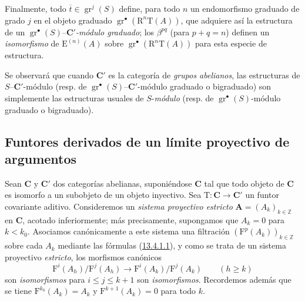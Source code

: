 \begin{env}[13.6.6]
Finalmente, todo $\overline t\in\operatorname{gr}^j(S)$ define, para todo
$n$ un endomorfismo graduado de grado $j$ en el objeto graduado $\operatorname{gr}^\bullet(\mathrm R^n\mathrm T(A))$, que adquiere así la
estructura de un
$\operatorname{gr}^\bullet(S)$--\emph{$\boldsymbol{C}'$-módulo graduado}; los $\beta^{pq}$ (para $p+q=n$) definen un \emph{isomorfismo} de
$\mathrm E^{(n)}(A)$ sobre
$\operatorname{gr}^\bullet(\mathrm R^n\mathrm T(A))$ para esta especie
de estructura.

Se observará que cuando $\boldsymbol{C}'$ es la categoría de \emph{grupos abelianos}, las
estructuras de $S$--$\boldsymbol{C}'$-módulo (resp. de
$\operatorname{gr}^\bullet(S)$--$\boldsymbol{C}'$-módulo graduado o bigraduado) son
simplemente las estructuras usuales de $S$-\emph{módulo} (resp. de
$\operatorname{gr}^\bullet(S)$-módulo graduado o bigraduado).
\end{env}

\subsection{Funtores derivados de un límite proyectivo de argumentos}
\label{subsection:0.13.7}
\label{subsection:0.13.7-fr}
\label{0.13.7}

\begin{env}[13.7.1]
\label{0.13.7.1}
\label{0.13.7.1-fr}
Sean $\boldsymbol{C}$ y $\boldsymbol{C}'$ dos categorías abelianas, suponiéndose $\boldsymbol{C}$ tal que todo objeto de $\boldsymbol{C}$ es isomorfo a un subobjeto de un
objeto inyectivo.
Sea
$\mathrm T:\boldsymbol{C}\to \boldsymbol{C}'$
un funtor covariante aditivo.
Consideremos un \emph{sistema proyectivo estricto}
$\mathbf A=(A_k)_{k\in\mathbb Z}$ en $\boldsymbol{C}$, acotado inferiormente; más
precisamente, supongamos que $A_k=0$ para $k<k_0$. Asociamos canónicamente a este sistema una filtración $(\mathrm F^p(A_k))_{k\in\mathbb Z}$ sobre cada $A_k$ mediante las fórmulas (\hyperref[0.13.4.1.1-fr]{13.4.1.1}), y como se trata de un sistema proyectivo \emph{estricto}, los morfismos canónicos
\begin{equation}
\label{0.13.7.1.1-fr}
\tag{13.7.1.1}
\mathrm F^i(A_h)/\mathrm F^j(A_h)\to
\mathrm F^i(A_k)/\mathrm F^j(A_k)\qquad(h\geq k)
\end{equation}
son \emph{isomorfismos} para $i\leq j\leq k+1$ son \emph{isomorfismos}. Recordemos además que se tiene $\mathrm F^{k_0}(A_k)=A_k$ y
$\mathrm F^{k+1}(A_k)=0$ para todo $k$.
\end{env}

